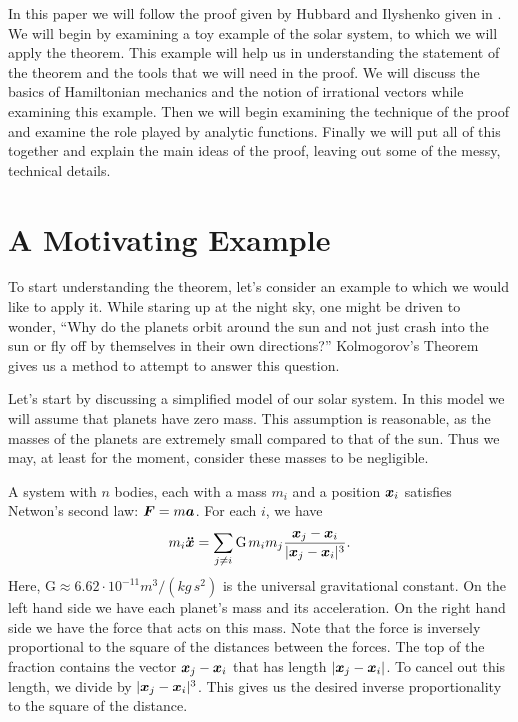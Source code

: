 \documentclass[twoside,letterpaper,10pt]{article}
\numberwithin{equation}{section}
\begin{document}
In this paper we will follow the proof given by Hubbard and Ilyshenko given in
\cite{hi02}.
We will begin by examining a toy example of the solar system, to which we will
apply the theorem.
This example will help us in understanding the statement of the theorem and the
tools that we will need in the proof.
We will discuss the basics of Hamiltonian mechanics and the notion of irrational
vectors while examining this example.
Then we will begin examining the technique of the proof and examine the role
played by analytic functions.
Finally we will put all of this together and explain the main ideas of the
proof, leaving out some of the messy, technical details.

\section{A Motivating Example}
\label{sec:motivating-example}

To start understanding the theorem, let's consider an example to which we would
like to apply it.
While staring up at the night sky, one might be driven to wonder, ``Why do the
planets orbit around the sun and not just crash into the sun or fly off by
themselves in their own directions?''
Kolmogorov's Theorem gives us a method to attempt to answer this question.

Let's start by discussing a simplified model of our solar system.
In this model we will assume that planets have zero mass.
This assumption is reasonable, as the masses of the planets are extremely small
compared to that of the sun.
Thus we may, at least for the moment, consider these masses to be negligible.

A system with $n$ bodies, each with a mass $m_i$ and a position $\bm{x}_i$
satisfies Netwon's second law: $\bm{F} = m \bm{a}$.
For each $i$, we have
\begin{equation*}
  m_i \bdd{x} = \sum_{j \neq i} \mathrm{G} \nobreak\hspace{.125em plus
    .14286em} m_i m_j \frac{\bp{x}_j - \bp{x}_i}{|\bp{x}_j - \bp{x}_i|^3}.
\end{equation*}
Here, $\mathrm{G} \approx 6.62 \cdot 10^{-11} m^3 / (kg\, s^2)$ is the universal
gravitational constant.
On the left hand side we have each planet's mass and its acceleration.
On the right hand side we have the force that acts on this mass.
Note that the force is inversely proportional to the square of the distances
between the forces.
The top of the fraction contains the vector $\bm{x}_j - \bm{x}_i$ that has
length $|\bm{x}_j - \bm{x}_i|$.
To cancel out this length, we divide by $|\bm{x}_j - \bm{x}_i|^3$.
This gives us the desired inverse proportionality to the square of the distance.
\end{document}
